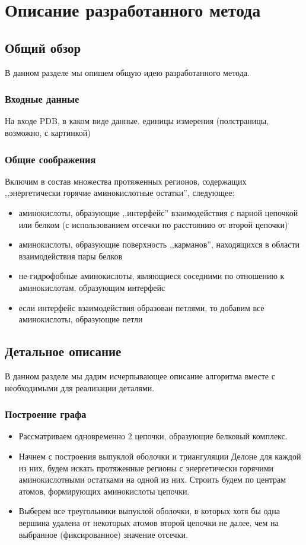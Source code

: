 \chapter{Описание разработанного метода}

\section{Общий обзор}
В данном разделе мы опишем общую идею разработанного метода.

\subsection{Входные данные}
На входе PDB, в каком виде данные. единицы измерения
(полстраницы, возможно, с картинкой)
\vspace{10cm}

\subsection{Общие соображения}
Включим в состав множества протяженных регионов, содержащих ,,энергетически горячие аминокислотные остатки'', следующее:
\begin{itemize}
\item аминокислоты, образующие ,,интерфейс'' взаимодействия с парной цепочкой или белком (с использованием отсечки по расстоянию от второй цепочки)
\item аминокислоты, образующие поверхность ,,карманов'', находящихся в области взаимодействия пары белков
\item не-гидрофобные аминокислоты, являющиеся соседними по отношению к аминокислотам, образующим интерфейс
\item если интерфейс взаимодействия образован петлями, то добавим все аминокислоты, образующие петли 
\end{itemize}

\section{Детальное описание}
В данном разделе мы дадим исчерпывающее описание алгоритма вместе с необходимыми для реализации деталями.
\subsection{Построение графа}
\begin{itemize}
\item Рассматриваем одновременно 2 цепочки, образующие белковый комплекс.
\item Начнем с построения выпуклой оболочки и триангуляции Делоне для каждой из них, будем искать протяженные регионы с энергетически горячими аминокислотными остатками  на одной из них. Строить будем по центрам атомов, формирующих аминокислоты цепочки.
\item Выберем все треугольники выпуклой оболочки, в которых хотя бы одна вершина удалена от некоторых атомов второй цепочки не далее, чем на выбранное (фиксированное) значение отсечки.
\end{itemize}


